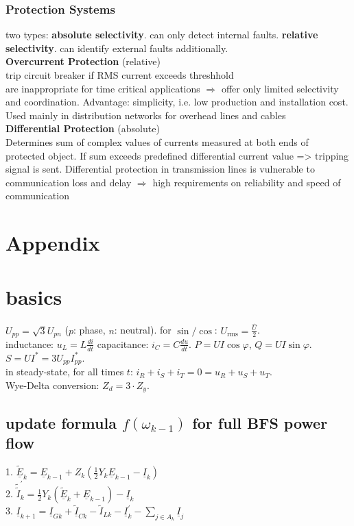\documentclass[a4paper,10pt,landscape]{scrartcl}
\begin{document}
\begin{multicols*}{3}
\subsubsection{Protection Systems}
two types: \textbf{absolute selectivity}. can only detect internal faults. \textbf{relative selectivity}. can identify external faults additionally. \\
\textbf{Overcurrent Protection} (relative) \\
trip circuit breaker if RMS current exceeds threshhold \\
are inappropriate for time critical applications $\Rightarrow$ offer only limited selectivity and coordination. Advantage: simplicity, i.e. low production and installation cost. Used mainly in distribution networks for overhead lines and cables \\
\textbf{Differential Protection} (absolute) \\
Determines sum of complex values of currents measured at both
ends of protected object. If sum exceeds predefined differential current value => tripping
signal is sent. Differential protection in transmission lines is vulnerable to
communication loss and delay $\Rightarrow$ high requirements on reliability
and speed of communication

\section{Appendix}
\section{basics}
$U_{pp}=\sqrt{3}U_{pn}$ ($p$: phase, $n$: neutral). for $\sin/\cos$: $U_\mathrm{rms}=\frac{\hat{U}}{2}$. \\
inductance: $u_L=L\frac{di}{dt}$ capacitance: $i_C=C\frac{du}{dt}$. $P=UI\cos\varphi$, $Q=UI\sin\varphi$. $S=UI^*=3U_{pp}I_{pp}^*$. \\
in steady-state, for all times $t$: $i_R+i_S+i_T=0=u_R+u_S+u_T$. \\
Wye-Delta conversion: $Z_d=3\cdot Z_y$.

\subsection{update formula $f(\omega_{k-1})$ for full BFS power flow} \label{full_NRM_f}
\begin{mdframed}
1. $\underline{\tilde{E}}_k=\underline{E}_{k-1}+Z_k\left(\frac{1}{2} Y_k \underline{E}_{k-1}-\underline{I}_k\right)$ \\
2. $\tilde{\tilde{I}}_k^{\prime}=\frac{1}{2} Y_k\left(\underline{\tilde{E}}_k+\underline{E}_{k-1}\right)-\underline{I}_k $ \\
3. $\underline{I}_{k+1}=\underline{I}_{G k}+\underline{\tilde{I}}_{C k}-\tilde{I}_{L k}-\underline{I}_k^{\prime}-\sum_{j \in A_k} \underline{I}_j$ \\
\end{mdframed}






\end{multicols*}
\end{document}
